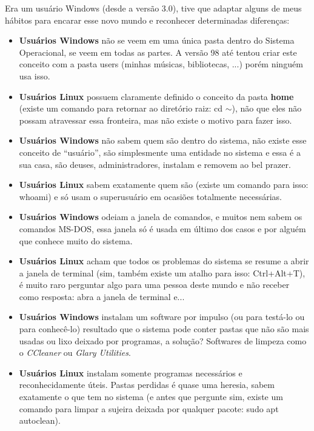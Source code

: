 Era um usuário Windows (desde a versão 3.0), tive que adaptar alguns de meus hábitos para encarar esse novo mundo e reconhecer determinadas diferenças: \vspace{-1em}
\begin{itemize}[noitemsep]
 \item \textbf{Usuários Windows} não se veem em uma única pasta dentro do Sistema Operacional, se veem em todas as partes. A versão 98 até tentou criar este conceito com a pasta users (minhas músicas, bibliotecas, ...) porém ninguém usa isso. 
 \item \textbf{Usuários Linux} possuem claramente definido o conceito da pasta \textbf{home} (existe um comando para retornar ao diretório raiz: cd $\sim$), não que eles não possam atravessar essa fronteira, mas não existe o motivo para fazer isso.
 \item \textbf{Usuários Windows} não sabem quem são dentro do sistema, não existe esse conceito de ``usuário'', são simplesmente uma entidade no sistema e essa é a sua casa, são deuses, administradores, instalam e removem ao bel prazer.
 \item \textbf{Usuários Linux} sabem exatamente quem são (existe um comando para isso: whoami) e só usam o superusuário em ocasiões totalmente necessárias.
 \item \textbf{Usuários Windows} odeiam a janela de comandos, e muitos nem sabem os comandos MS-DOS, essa janela só é usada em último dos casos e por alguém que conhece muito do sistema.
 \item \textbf{Usuários Linux} acham que todos os problemas do sistema se resume a abrir a janela de terminal (sim, também existe um atalho para isso: Ctrl+Alt+T), é muito raro perguntar algo para uma pessoa deste mundo e não receber como resposta: abra a janela de terminal e...
 \item \textbf{Usuários Windows} instalam um software por impulso (ou para testá-lo ou para conhecê-lo) resultado que o sistema pode conter pastas que não são mais usadas ou lixo deixado por programas, a solução? Softwares de limpeza como o \textit{CCleaner} ou \textit{Glary Utilities}.
 \item \textbf{Usuários Linux} instalam somente programas necessários e reconhecidamente úteis. Pastas perdidas é quase uma heresia, sabem exatamente o que tem no sistema (e antes que pergunte sim, existe um comando para limpar a sujeira deixada por qualquer pacote: sudo apt autoclean).
\end{itemize}

